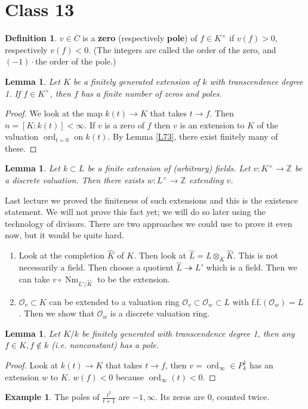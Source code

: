 \documentclass{article}
\newcommand{\Z}{\mathbb{Z}}
\DeclareMathOperator{\ord}{ord}
\DeclareMathOperator{\Nm}{Nm}
\theoremstyle{plain}
\newtheorem{lem}[thm]{Lemma}
\theoremstyle{definition}
\newtheorem{defn}{Definition}
\newtheorem{exmp}{Example}
\theoremstyle{remark}
\begin{document}
\section*{Class 13}


\begin{defn}
$v\in C$ is a \textbf{zero} (respectively \textbf{pole}) of $f \in K^{\times}$ if $v(f) >0$, respectively $v(f)<0$. (The integers are called the order of the zero, and $(-1)\cdot$the order of the pole.)
\end{defn}
\begin{lem}
\label{L74}
Let $K$ be a finitely generated extension of $k$ with transcendence degree 1. If $f\in K^{\times}$, then $f$ has a finite number of zeros and poles.
\end{lem}
\begin{proof}
We look at the map $k(t) \to K$ that takes $t\to f$. Then $n = [K : k(t)] < \infty$. If $v$ is a zero of $f$ then $v$ is an extension to $K$ of the valuation $\ord_{t=0}$ on $k(t)$. By Lemma \ref{L73}, there exist finitely many of these.
\end{proof}

\begin{lem}
\label{L75}
Let $k\subset L$ be a finite extension of (arbitrary) fields. Let $v:K^{\times} \to \Z$ be a discrete valuation. Then there exists $w:L^{\times} \to \Z$ extending $v$.
\end{lem}
Last lecture we proved the finiteness of such extensions and this is the existence statement. We will not prove this fact yet; we will do so later using the technology of divisors. There are two approaches we could use to prove it even now, but it would be quite hard.
\begin{enumerate}
\item Look at the completion $\hat K$ of $K$. Then look at $\hat L = L \otimes_K \hat K$. This is not necessarily a field. Then choose a quotient $\hat L \twoheadrightarrow L'$ which is a field. Then we can take $v\circ \Nm_{L'/\hat K}$ to be the extension.
\item $\mathcal{O}_v \subset K$ can be extended to a valuation ring $\mathcal{O}_v \subset \mathcal{O}_w \subset L$ with f.f.$(\mathcal{O}_w) = L$. Then we show that $\mathcal{O}_w$ is a discrete valuation ring.
\end{enumerate}

\begin{lem}
\label{L76}
Let $K/k$ be finitely generated with transcendence degree 1, then any $f\in K, f\not \in k$ (i.e. nonconstant) has a pole.
\end{lem}
\begin{proof}
Look at $k(t) \to K$ that takes $t\to f$, then $v = \ord_{\infty} \in P^1_k$ has an extension $w$ to $K$. $w(f)<0$ because $\ord_{\infty}(t)<0$.
\end{proof}
\begin{exmp}
The poles of $\frac{t^2}{t+1}$ are $-1, \infty$. Its zeros are $0$, counted twice.
\end{exmp}
\end{document}
